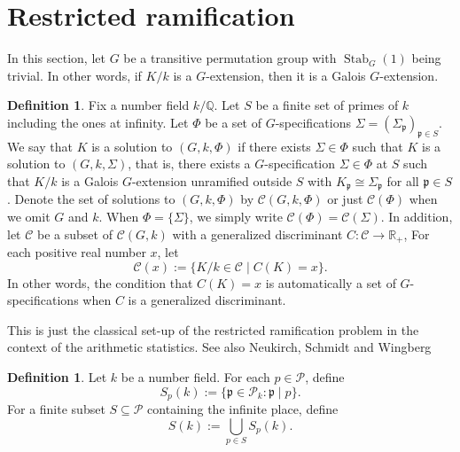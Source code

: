 \documentclass[12pt,a4paper]{amsart}
\numberwithin{equation}{section}%
\theoremstyle{plain}%
\theoremstyle{definition}%
\newtheorem{definition}[theorem]{Definition}%
\theoremstyle{remark}%
\begin{document}
	\section{Restricted ramification}\label{sec: restricted ramification}
	In this section, let $G$ be a transitive permutation group with $\operatorname{Stab}_G(1)$ being trivial.
	In other words, if $K/k$ is a $G$-extension, then it is a Galois $G$-extension.
	\begin{definition}\label{def: restricted ramification}
		Fix a number field $k/\mathbb{Q}$.
		Let $S$ be a finite set of primes of $k$ including the ones at infinity.
		Let $\Phi$ be a set of $G$-specifications $\Sigma=(\Sigma_{\mathfrak{p}})_{\mathfrak{p}\in S}$.
		We say that $K$ is a solution to $(G,k,\Phi)$ if there exists $\Sigma\in\Phi$ such that $K$ is a solution to $(G,k,\Sigma)$, 
		that is, there exists a $G$-specification $\Sigma\in\Phi$ at $S$ such that $K/k$ is a Galois $G$-extension unramified outside $S$ with $K_{\mathfrak{p}}\cong\Sigma_{\mathfrak{p}}$ for all $\mathfrak{p}\in S$.
		Denote the set of solutions to $(G,k,\Phi)$ by $\mathcal{C}(G,k,\Phi)$ or just $\mathcal{C}(\Phi)$ when we omit $G$ and $k$.
		When $\Phi=\{\Sigma\}$, we simply write $\mathcal{C}(\Phi)=\mathcal{C}(\Sigma)$.
		In addition, let $\mathcal{C}$ be a subset of $\mathcal{C}(G,k)$ with a generalized discriminant $C:\mathcal{C}\to\mathbb{R}_{+}$,
		For each positive real number $x$, let
		\begin{equation*}
			\mathcal{C}(x):=\{K/k\in\mathcal{C}\mid C(K)=x\}.
		\end{equation*}
		In other words, the condition that $C(K)=x$ is automatically a set of $G$-specifications when $C$ is a generalized discriminant.
	\end{definition}
	This is just the classical set-up of the restricted ramification problem in the context of the arithmetic statistics.
	See also Neukirch, Schmidt and Wingberg~\cite[Chapter X]{neukirch2013cohomology}	
	\begin{definition}
		Let $k$ be a number field.
		For each $p\in\mathcal{P}$, define
		\begin{equation*}
			S_p(k):=\{\mathfrak{p}\in\mathcal{P}_k:\mathfrak{p}\mid p\}.
		\end{equation*}
		For a finite subset $S\subseteq\mathcal{P}$ containing the infinite place, define
		\begin{equation*}
			S(k):=\bigcup_{p\in S}S_p(k).
		\end{equation*}		
	\end{definition}	
\end{document}
